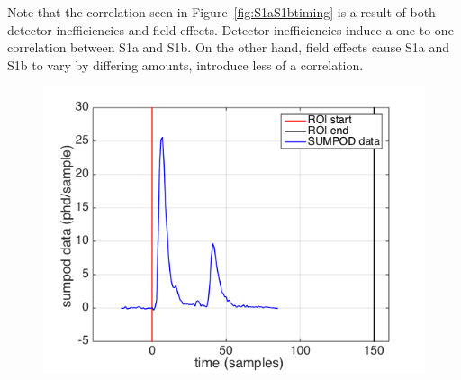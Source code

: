 Note that the correlation seen in Figure~\ref{fig:S1aS1btiming} is a result of both detector inefficiencies and field effects.  Detector inefficiencies induce a one-to-one correlation between S1a and S1b.  On the other hand, field effects cause S1a and S1b to vary by differing amounts, introduce less of a correlation.

\begin{figure}[!h]
\includegraphics[scale=0.6]{Run04Corrections/s1a_s1b_sumpod.png}
 \label{fig:Sumpod}
\end{figure}

\newpage

